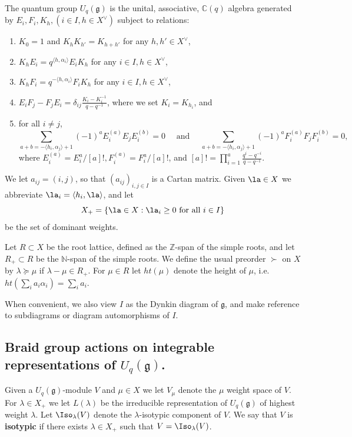 \documentclass[11pt,reqno]{amsart}
\numberwithin{equation}{section}
\theoremstyle{definition}
\theoremstyle{named}
\newcommand{\fg}{\mathfrak{g}}
\newcommand{\CC}{\mathbb{C}}
\newcommand{\NN}{\mathbb{N}}
\newcommand{\ZZ}{\mathbb{Z}}
\begin{document}
The quantum group $U_q(\fg)$ is the unital, associative, $\CC(q)$ algebra generated by $E_i,F_i,K_h, (i\in I, h\in X^\vee)$ subject to relations:
\begin{enumerate}
\item $K_0=1$ and $K_hK_{h'}=K_{h+h'}$ for any $h,h'\in X^\vee$,
\item $K_hE_i=q^{\langle h,\alpha_i \rangle}E_iK_h$ for any $i\in I, h\in X^\vee$,
\item $K_hF_i=q^{-\langle h,\alpha_i \rangle}F_iK_h$ for any $i\in I, h\in X^\vee$,
\item $E_iF_j-F_jE_i=\delta_{ij}\frac{K_i-K_i^{-1}}{q-q^{-1}}$, where we set $K_i=K_{h_i}$, and
\item for all $i\neq j$,
$$
\sum_{a+b=-\langle h_i,\alpha_j \rangle+1}(-1)^aE_i^{(a)}E_j E_i^{(b)}=0 \quad \text{ and } \quad \sum_{a+b=-\langle h_i,\alpha_j \rangle+1}(-1)^aF_i^{(a)}F_j F_i^{(b)}=0,
$$
where $E_i^{(a)}=E_i^a/[a]!, F_i^{(a)}=F_i^a/[a]!$, and $[a]!=\prod_{i=1}^a \frac{q^i-q^{-i}}{q-q^{-1}}$.
\end{enumerate}

We let $a_{ij}=(i,j)$, so that $(a_{ij})_{i,j\in I}$ is a Cartan matrix.  Given $\la \in X$ we abbreviate $\la_i=\langle h_i,\la\rangle$, and let $$X_+=\{\la\in X:\la_i\geq0 \text{ for all } i\in I\}$$ be the set of dominant weights.  

Let $R\subset X$ be the root lattice, defined as the $\ZZ$-span of the simple roots, and let $R_+\subset R$ be the $\NN$-span of the simple roots.  We define the usual preorder $\succ$ on $X$ by $\lambda \succeq \mu$ if $\lambda-\mu \in R_+$.
For $\mu \in R$ let $ht(\mu)$ denote the height of $\mu$, i.e. $ht(\sum_i a_i\alpha_i)=\sum_i a_i$.

When convenient, we also view $I$ as the Dynkin diagram of $\fg$, and make reference to subdiagrams or diagram automorphisms of $I$.

\subsection{Braid group actions on integrable representations of $U_q(\fg)$.}     
Given a $U_q(\fg)$-module $V$ and $\mu \in X$ we let $V_\mu$ denote the $\mu$ weight space of $V$.  
For $\lambda \in X_+$ we let $L(\lambda)$ be the irreducible representation of $U_q(\fg)$ of highest weight $\lambda$.  Let $\Iso_\lambda(V)$ denote the $\lambda$-isotypic component of $V$.  We say that $V$ is \textbf{isotypic} if there exists $\lambda \in X_+$ such that $V=\Iso_\lambda(V)$.
\end{document}

